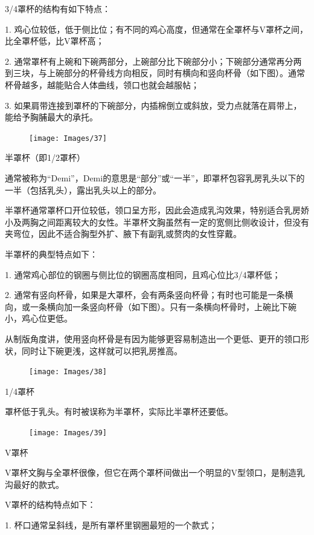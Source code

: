 \documentclass[12pt,UTF8]{ctexbook}
\begin{document}
3/4罩杯的结构有如下特点：

1. 鸡心位较低，低于侧比位；有不同的鸡心高度，但通常在全罩杯与V罩杯之间，比全罩杯低，比V罩杯高；

2. 通常罩杯有上碗和下碗两部分，上碗部分比下碗部分小；下碗部分通常再分两到三块，与上碗部分的杯骨线方向相反，同时有横向和竖向杯骨（如下图）。通常杯骨越多，越能贴合人体曲线，领口也就会越服帖；

3. 如果肩带连接到罩杯的下碗部分，内插棉倒立或斜放，受力点就落在肩带上，能给予胸脯最大的承托。

\begin{figure}[htbp]
	\centering
	\texttt{[image: Images/37]}
	\caption{}
	\label{fig:1}
\end{figure}

半罩杯（即1/2罩杯）

通常被称为“Demi”，Demi的意思是“部分”或“一半”，即罩杯包容乳房乳头以下的一半（包括乳头），露出乳头以上的部分。

半罩杯通常罩杯口开位较低，领口呈方形，因此会造成乳沟效果，特别适合乳房娇小及两胸之间距离较大的女性。半罩杯文胸虽然有一定的宽侧比侧收设计，但没有夹弯位，因此不适合胸型外扩、腋下有副乳或赘肉的女性穿戴。

半罩杯的典型特点如下：

1. 通常鸡心部位的钢圈与侧比位的钢圈高度相同，且鸡心位比3/4罩杯低；

2. 通常有竖向杯骨，如果是大罩杯，会有两条竖向杯骨；有时也可能是一条横向，或一条横向加一条竖向杯骨（如下图）。只有一条横向杯骨时，上碗比下碗小，鸡心位更低。

从制版角度讲，使用竖向杯骨是有因为能够更容易制造出一个更低、更开的领口形状，同时让下碗更浅，这样就可以把乳房推高。

\begin{figure}[htbp]
	\centering
	\texttt{[image: Images/38]}
	\caption{}
	\label{fig:1}
\end{figure}

1/4罩杯

罩杯低于乳头。有时被误称为半罩杯，实际比半罩杯还要低。

\begin{figure}[htbp]
	\centering
	\texttt{[image: Images/39]}
	\caption{}
	\label{fig:1}
\end{figure}

V罩杯

V罩杯文胸与全罩杯很像，但它在两个罩杯间做出一个明显的V型领口，是制造乳沟最好的款式。

V罩杯的结构特点如下：

1. 杯口通常呈斜线，是所有罩杯里钢圈最短的一个款式；
\end{document}

